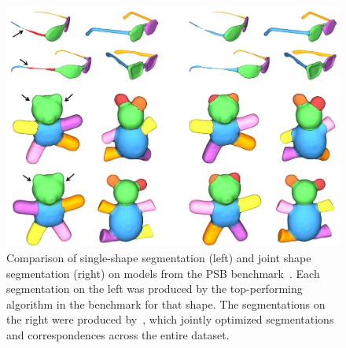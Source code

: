 \begin{figure}[t!]
\centering
    \includegraphics[width=1.0\columnwidth]{fig/img/huang_siga11_jss.png}
    \caption{Comparison of single-shape segmentation (left) and joint shape segmentation (right) on models from the PSB benchmark~\cite{Chen:2009:BMS}. Each segmentation on the left was produced by the top-performing algorithm in the benchmark for that shape. The segmentations on the right were produced
by~\cite{Huang:2011:JSS}, which jointly optimized segmentations and correspondences across the entire dataset.}
    \label{fig:huang_siga11_jss}
\end{figure}

